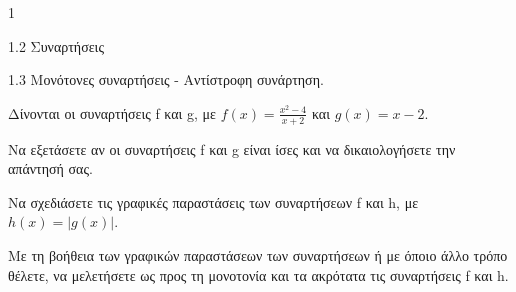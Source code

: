 \begin{ylh}{1}
    \item 1.2 Συναρτήσεις
    \item 1.3 Μονότονες συναρτήσεις - Αντίστροφη συνάρτηση.
\end{ylh}
Δίνονται οι συναρτήσεις f και g, με $f(x) = \frac{x^2-4}{x+2}$ και $g(x) = x-2$.
\begin{alist}
    \item Να εξετάσετε αν οι συναρτήσεις f και g είναι ίσες και να δικαιολογήσετε την απάντησή σας. 
    \item Να σχεδιάσετε τις γραφικές παραστάσεις των συναρτήσεων f και h, με $h(x) = |g(x)|$. 
    \item Με τη βοήθεια των γραφικών παραστάσεων των συναρτήσεων ή με όποιο άλλο τρόπο θέλετε, να μελετήσετε ως προς τη μονοτονία και τα ακρότατα τις συναρτήσεις f και h. 
\end{alist}